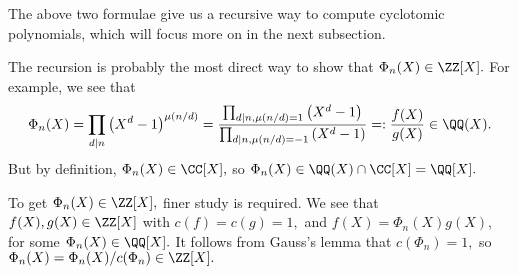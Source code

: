 \documentclass[../notes.tex]{subfiles}
\begin{document}
The above two formulae give us a recursive way to compute cyclotomic polynomials, which will focus more on in the next subsection.
\begin{remark}[Nir]
	The recursion is probably the most direct way to show that $\Phi_n(X)\in\ZZ[X].$ For example, we see that
	\[\Phi_n(X)=\prod_{d\mid n}\left(X^d-1\right)^{\mu(n/d)}=\frac{\prod_{d\mid n,\mu(n/d)=1}\left(X^d-1\right)}{\prod_{d\mid n,\mu(n/d)=-1}\left(X^d-1\right)}=:\frac{f(X)}{g(X)}\in\QQ(X).\]
	But by definition, $\Phi_n(X)\in\CC[X],$ so $\Phi_n(X)\in\QQ(X)\cap\CC[X]=\QQ[X].$
	
	To get $\Phi_n(X)\in\ZZ[X],$ finer study is required. We see that $f(X),g(X)\in\ZZ[X]$ with $c(f)=c(g)=1,$ and $f(X)=\Phi_n(X)g(X),$ for some $\Phi_n(X)\in\QQ[X].$ It follows from Gauss's lemma that $c(\Phi_n)=1,$ so $\Phi_n(X)=\Phi_n(X)/c(\Phi_n)\in\ZZ[X].$
\end{remark}
\end{document}
